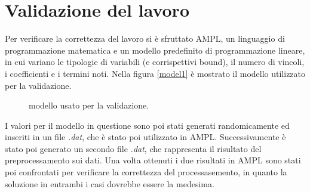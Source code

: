 \documentclass{article}
\newcommand{\perlscript}[2]{
\begin{figure}[ht]
\scalebox{.9}{
}
\caption{\footnotesize{ modello usato per la validazione.}}
\end{figure}
}
\begin{document}
\section{Validazione del lavoro}
Per verificare la correttezza del lavoro si è sfruttato AMPL, un linguaggio di programmazione matematica e un modello predefinito di programmazione lineare, in cui variano le tipologie di variabili (e corrispettivi bound), il numero di vincoli, i coefficienti e i termini noti. Nella figura \ref{model1} è mostrato il modello utilizzato per la validazione.
\perlscript{model1}{Modello usato per la validazione.}
\newline
\newline
I valori per il modello in questione sono poi stati generati randomicamente ed inseriti in un file \textit{.dat}, che è stato poi utilizzato in AMPL. Successivamente è stato poi generato un secondo file \textit{.dat}, che rappresenta il risultato del preprocessamento sui dati. Una volta ottenuti i due risultati in AMPL sono stati poi confrontati per verificare la correttezza del processasemento, in quanto la soluzione in entrambi i casi dovrebbe essere la medesima.




\end{document}
